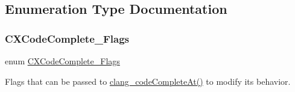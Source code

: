 \subsection{Enumeration Type Documentation}
\mbox{\label{group__CINDEX__CODE__COMPLET_gaaad70639b9973354626101151db4154b}} 
\subsubsection{\texorpdfstring{C\+X\+Code\+Complete\+\_\+\+Flags}{CXCodeComplete\_Flags}}
{\footnotesize\ttfamily enum \hyperlink{group__CINDEX__CODE__COMPLET_gaaad70639b9973354626101151db4154b}{C\+X\+Code\+Complete\+\_\+\+Flags}}



Flags that can be passed to {\ttfamily \hyperlink{group__CINDEX__CODE__COMPLET_ga50fedfa85d8d1517363952f2e10aa3bf}{clang\+\_\+code\+Complete\+At()}} to modify its behavior. 


